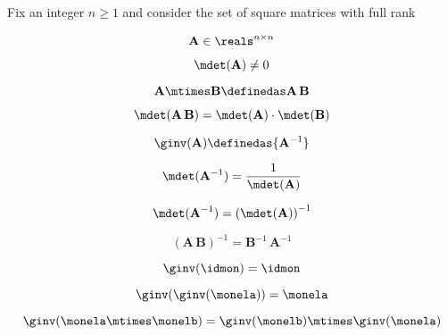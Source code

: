 \begin{example}\label{exa:square-full}

Fix an integer $n\geq1 $ and consider the set of square matrices with full rank


\begin{equation} \label{eq:group-fullrank-issquare}
    \mathbf{A} \in \reals^{n\times n}
\end{equation}

\begin{equation} \label{eq:group-fullrank-isfullrank}
   \mdet(\mathbf{A}) \neq 0
\end{equation}


\begin{equation} \label{eq:group-fullrank-composition}
   \mathbf{A} \mtimes \mathbf{B}  \definedas \mathbf{A}\,\mathbf{B}
\end{equation}


\begin{equation} \label{eq:group-fullrank-composition-det}
   \mdet(\mathbf{A} \, \mathbf{B}) = \mdet(\mathbf{A}) \cdot  \mdet(\mathbf{B})
\end{equation}

\begin{equation} \label{eq:group-fullrank-inverse}
   \ginv(\mathbf{A}) \definedas {\mathbf{A}^{-1}}
\end{equation}


\begin{equation} \label{eq:group-fullrank-inverse-det}
   \mdet(\mathbf{A}^{-1}) = \frac{1}{\mdet(\mathbf{A})}
\end{equation}

\begin{equation} \label{eq:group-fullrank-inverse-det2}
   \mdet(\mathbf{A}^{-1}) = \left( \mdet(\mathbf{A}) \right) ^ {-1}
\end{equation}

\begin{equation} \label{eq:group-fullrank-inverse-comp}
   (\mathbf{A}\,\mathbf{B})^{-1} = {\mathbf{B}^{-1} \, \mathbf{A}^{-1}}
\end{equation}


\begin{equation}\label{eq:group-neutral-invariant}
        \ginv(\idmon) = \idmon
      \end{equation}


\begin{equation}\label{eq:group-inverse-inverse}
        \ginv(\ginv(\monela)) = \monela
      \end{equation}


\begin{equation}\label{eq:group-inverse-of-composition}
    \ginv(\monela \mtimes \monelb ) = \ginv(\monelb) \mtimes \ginv(\monela)
\end{equation}

\end{example}

